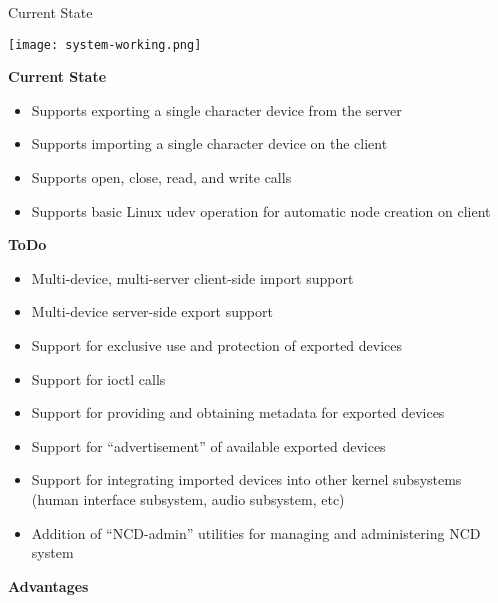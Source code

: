 \documentclass[xcolor=dvipsnames]{beamer}
\begin{document}
\begin{frame}[c]{Current State}
  \begin{center}
    \texttt{[image: system-working.png]}
  \end{center}
\end{frame}

\begin{frame}{\bf Current State}

\begin{itemize}
\item<1-> Supports exporting a single character device from the server
\item<2-> Supports importing a single character device on the client
\item<3-> Supports open, close, read, and write calls
\item<4-> Supports basic Linux udev operation for automatic node creation on client
\end{itemize}

\end{frame}

\begin{frame}{\bf ToDo}

\begin{itemize}
\item Multi-device, multi-server client-side import support
\item Multi-device server-side export support
\item Support for exclusive use and protection of exported devices
\item Support for ioctl calls
\item Support for providing and obtaining metadata for exported
  devices
\item Support for ``advertisement'' of available exported devices
\item Support for integrating imported devices into other kernel
  subsystems (human interface subsystem, audio subsystem, etc)
\item Addition of ``NCD-admin'' utilities for managing and administering
  NCD system
\end{itemize}

\end{frame}

\begin{frame}{\bf Advantages}

\end{frame}
\end{document}

